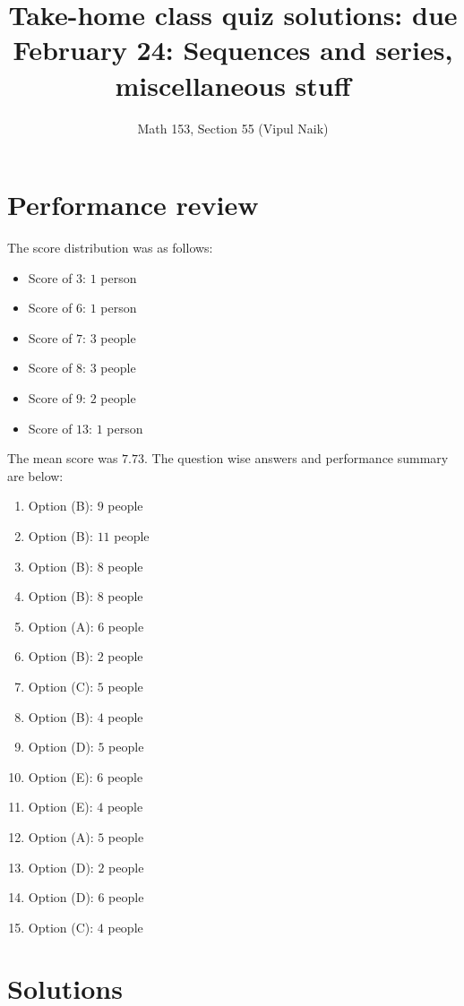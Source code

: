 \documentclass[10pt]{amsart}
\title{Take-home class quiz solutions: due February 24: Sequences and series, miscellaneous stuff}
\author{Math 153, Section 55 (Vipul Naik)}
\begin{document}
\maketitle

\section{Performance review}

The score distribution was as follows:

\begin{itemize}
\item Score of $3$: $1$ person
\item Score of $6$: $1$ person
\item Score of $7$: $3$ people
\item Score of $8$: $3$ people
\item Score of $9$: $2$ people
\item Score of $13$: $1$ person
\end{itemize}

The mean score was $7.73$. The question wise answers and performance
summary are below:

\begin{enumerate}
\item Option (B): $9$ people
\item Option (B): $11$ people
\item Option (B): $8$ people
\item Option (B): $8$ people
\item Option (A): $6$ people
\item Option (B): $2$ people
\item Option (C): $5$ people
\item Option (B): $4$ people
\item Option (D): $5$ people
\item Option (E): $6$ people
\item Option (E): $4$ people
\item Option (A): $5$ people
\item Option (D): $2$ people
\item Option (D): $6$ people
\item Option (C): $4$ people
\end{enumerate}

\section{Solutions}
\end{document}
